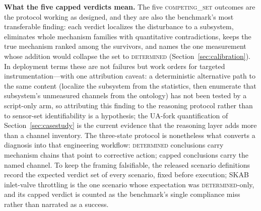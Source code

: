 \documentclass[preprint,10pt]{elsarticle}
\begin{document}
\textbf{What the five capped verdicts mean.} The five \mbox{\textsc{competing\_set}} outcomes are the protocol working as designed, and they are also the benchmark's most transferable finding: each verdict localizes the disturbance to a subsystem, eliminates whole mechanism families with quantitative contradictions, keeps the true mechanism ranked among the survivors, and names the one measurement whose addition would collapse the set to \mbox{\textsc{determined}} (Section~\ref{sec:calibration}). In deployment terms these are not failures but work orders for targeted instrumentation---with one attribution caveat: a deterministic alternative path to the same content (localize the subsystem from the statistics, then enumerate that subsystem's unmeasured channels from the ontology) has not been tested by a script-only arm, so attributing this finding to the reasoning protocol rather than to sensor-set identifiability is a hypothesis; the UA-fork quantification of Section~\ref{sec:casestudy} is the current evidence that the reasoning layer adds more than a channel inventory. The three-state protocol is nonetheless what converts a diagnosis into that engineering workflow: \mbox{\textsc{determined}} conclusions carry mechanism chains that point to corrective action; capped conclusions carry the named channel. To keep the framing falsifiable, the released scenario definitions record the expected verdict set of every scenario, fixed before execution; SKAB inlet-valve throttling is the one scenario whose expectation was \mbox{\textsc{determined}}-only, and its capped verdict is counted as the benchmark's single compliance miss rather than narrated as a success.
\end{document}
